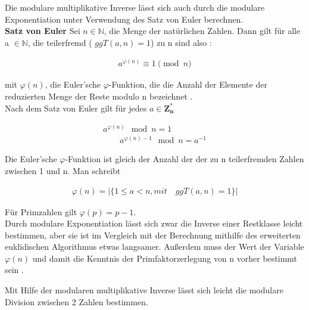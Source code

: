 Die modulare multiplikative Inverse lässt sich auch durch die modulare Exponentiation unter Verwendung des Satz von Euler berechnen. \\
\textbf{Satz von Euler}
Sei \(n \in \mathbb{N}\), die Menge der natürlichen Zahlen. Dann gilt
für alle a \(\in \mathbb{N}\), die teilerfremd ( $ ggT(a, n) = 1 $) zu n sind also \cite{langMIE}: \\

\begin{ceqn}
\begin{align*}
            a^{\varphi(n)} \equiv 1 \pmod n
\end{align*}
\end{ceqn}
mit $ \varphi(n)$, die Euler’sche $\varphi$-Funktion, die die Anzahl der Elemente der
reduzierten Menge der Reste modulo n bezeichnet \cite{damer}. \\

Nach dem Satz von Euler gilt für jedes \(a \in \mathbf{Z^*_n} \)\\

\begin{ceqn}
\begin{align*}
            a^{\varphi(n)} \mod n = 1 \\
    \qquad  a^{\varphi(n) - 1} \mod n = a^{-1}
\end{align*}
\end{ceqn}

Die Euler'sche $\varphi$-Funktion ist gleich der Anzahl der der zu n
teilerfremden Zahlen zwischen 1 und n. Man schreibt \\

\begin{ceqn}
\begin{align*}
         \varphi(n) = |\{ 1 \leq a < n, mit \quad ggT(a, n) = 1 \}|
\end{align*}
\end{ceqn}

Für Primzahlen gilt \(\varphi(p) = p - 1 \). \\

Durch modulare Exponentiation lässt sich zwar die Inverse einer Restklasse leicht bestimmen, aber sie ist im Vergleich mit der Berechnung mithilfe des erweiterten euklidischen Algorithmus etwas langsamer. Außerdem muss der Wert der Variable \(\varphi(n)\) und damit die Kenntnis der Primfaktorzerlegung von n vorher bestimmt sein \cite{langMIE}.

Mit Hilfe der modularen multiplikative Inverse lässt sich leicht die modulare Division zwischen 2 Zahlen bestimmen.


